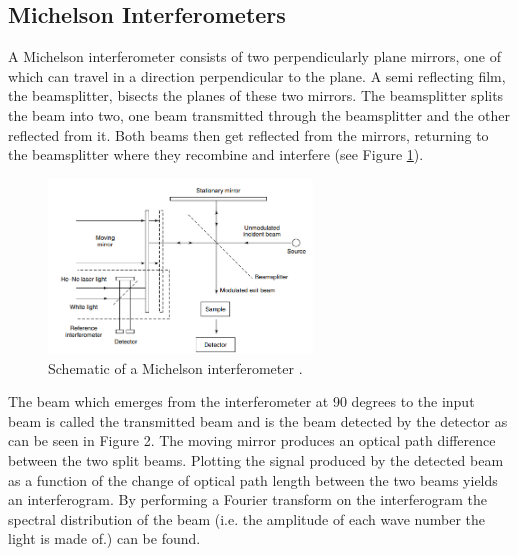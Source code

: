\documentclass[reprint,amsmath,amssymb,aps, prl]{revtex4-2}
\begin{document}
\subsection{Michelson Interferometers}
A Michelson interferometer consists of two perpendicularly plane mirrors, one of which can travel in a direction perpendicular to the plane.
A semi reflecting film, the beamsplitter, bisects the planes of these two mirrors. The beamsplitter splits the beam into two, one beam transmitted through the beamsplitter and the other reflected from it. Both beams then get reflected from the mirrors, returning to the beamsplitter where they recombine and interfere \cite{stuart} (see Figure \ref{fig:Interferometer}). 
\begin{figure}[h]
    \includegraphics[width=7cm]{Images/INTERFEROMETER.png}
    \caption{Schematic of a Michelson interferometer \cite{stuart}.}
    \label{fig:Interferometer}
    \centering
\end{figure}
The beam which emerges from the interferometer at 90 degrees to the input beam is called the transmitted beam and is the beam detected by the detector as can be seen in Figure 2.
The moving mirror produces an optical path difference between the two split beams.
Plotting the signal produced by the detected beam
as a function of the change of
optical path length between the two beams yields
an interferogram. By performing a Fourier transform on the interferogram the spectral distribution of the beam (i.e. the amplitude of each wave number the light is made of.)
can be found.
\end{document}
